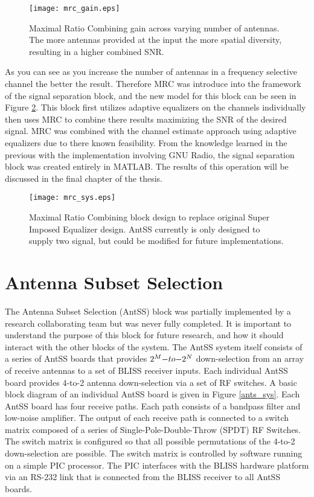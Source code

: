 \begin{figure}[!ht]\centering
\texttt{[image: mrc\_gain.eps]}
\caption{Maximal Ratio Combining gain across varying number of antennas.  The more antennas provided at the input the more spatial diversity, resulting in a higher combined SNR.}
\label{mrc_sys}
\end{figure}

As you can see as you increase the number of antennas in a frequency selective channel the better the result.  Therefore MRC was introduce into the framework of the signal separation block, and the new model for this block can be seen in Figure \ref{mrc_sys_ss}.  This block first utilizes adaptive equalizers on the channels individually then uses MRC to combine there results maximizing the SNR of the desired signal.  MRC was combined with the channel estimate approach using adaptive equalizers due to there known feasibility.  From the knowledge learned in the previous with the implementation involving GNU Radio, the signal separation block was created entirely in MATLAB.  The results of this operation will be discussed in the final chapter of the thesis.\\

\begin{figure}[!ht]
\centering
\texttt{[image: mrc\_sys.eps]}
\caption{Maximal Ratio Combining block design to replace original Super Imposed Equalizer design.  AntSS currently is only designed to supply two signal, but could be modified for future implementations.}
\label{mrc_sys_ss}
\end{figure}

\section{Antenna Subset Selection}

The Antenna Subset Selection (AntSS) block was partially implemented by a research collaborating team but was never fully completed.  It is important to understand the purpose of this block for future research, and how it should interact with the other blocks of the system.  The AntSS system itself consists of a series of AntSS boards that provides \(2^{M}$$ -to-$$2^{N}\) down-selection from an array of receive antennas to a set of BLISS receiver inputs. Each individual AntSS board provides 4-to-2 antenna down-selection via a set of RF switches. A basic block diagram of an individual AntSS board is given in Figure \ref{ants_sys}.  Each AntSS board has four receive paths. Each path consists of a bandpass filter and low-noise amplifier. The output of each receive path is connected to a switch matrix composed of a series of Single-Pole-Double-Throw (SPDT) RF Switches. The switch matrix is configured so that all possible permutations of the 4-to-2 down-selection are possible. The switch matrix is controlled by software running on a simple PIC processor. The PIC interfaces with the BLISS hardware platform via an RS-232 link that is connected from the BLISS receiver to all AntSS boards.\\

